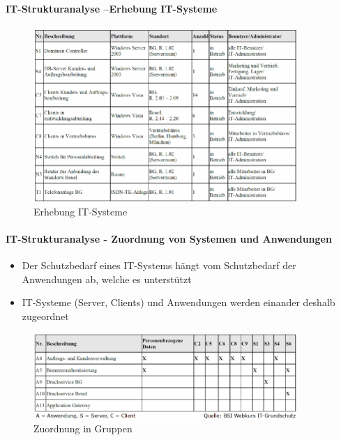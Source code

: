 \documentclass[10pt,a4paper]{article}
\begin{document}
\paragraph*{IT-Strukturanalyse –Erhebung IT-Systeme}
\begin{figure}[H]
    \begin{center}
    \includegraphics[width=10cm]{images/Erhebung IT-Systeme.png}
    \caption{Erhebung IT-Systeme}
    \label{Erhebung IT-Systeme}
    \end{center}
\end{figure}

\paragraph*{IT-Strukturanalyse - Zuordnung von Systemen und Anwendungen}
\begin{itemize}[noitemsep,topsep=0pt,leftmargin=*]
    \item Der Schutzbedarf eines IT-Systems hängt vom
    Schutzbedarf der Anwendungen ab, welche es
    unterstützt
    \item IT-Systeme (Server, Clients) und Anwendungen
    werden einander deshalb zugeordnet
\end{itemize}
\begin{figure}[H]
    \begin{center}
    \includegraphics[width=10cm]{images/Zuordnung_Sys_App.png}
    \caption{Zuordnung in Gruppen}
    \label{Zuordnung in Gruppen}
    \end{center}
\end{figure}
\end{document}
